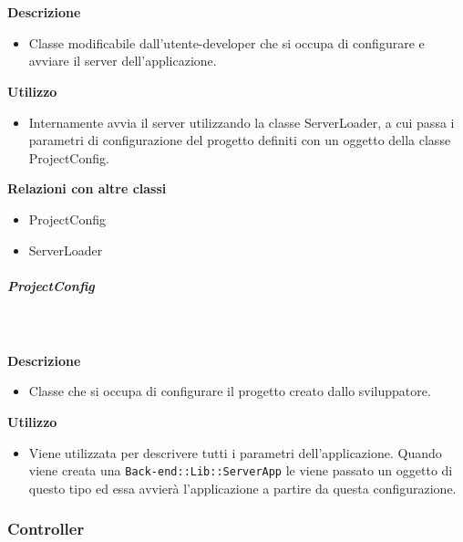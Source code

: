         \textbf{\\ \\ Descrizione} 
          \begin{itemize}
            \item[] Classe modificabile dall'utente-developer che si occupa di configurare e avviare il server dell'applicazione.
          \end{itemize}      
        \textbf{Utilizzo}  
          \begin{itemize}
            \item[] Internamente avvia il server utilizzando la classe ServerLoader, a cui passa i parametri di configurazione del progetto definiti con un oggetto della classe ProjectConfig.
          \end{itemize}
          \textbf{Relazioni con altre classi}
          \begin{itemize}
              \item{ProjectConfig}
              \item{ServerLoader}
          \end{itemize}
      \subparagraph{ProjectConfig}
        
        \textbf{\\ \\ Descrizione} 
          \begin{itemize}
            \item[] Classe che si occupa di configurare il progetto creato dallo sviluppatore.
          \end{itemize}      
        \textbf{Utilizzo}  
          \begin{itemize}
            \item[] Viene utilizzata per descrivere tutti i parametri dell'applicazione. Quando viene creata una \texttt{Back-end::Lib::ServerApp} le viene passato un oggetto di questo tipo ed essa avvierà l'applicazione a partire da questa configurazione.
          \end{itemize}
  \subsubsection{Controller}
